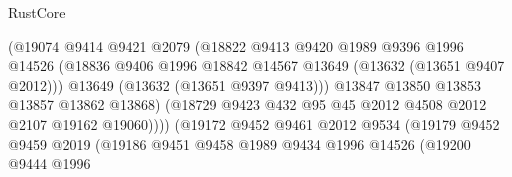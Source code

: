 \begin{lexlean}{RustCore}
\begin{coremodule}
                                      (@19074
                                        @9414
                                        @9421
                                        @2079
                                        (@18822
                                          @9413
                                          @9420
                                          @1989
                                          @9396
                                          @1996
                                          @14526
                                          (@18836
                                            @9406
                                            @1996
                                            @18842
                                            @14567
                                            @13649
                                            (@13632 (@13651 @9407 @2012)))
                                          @13649
                                          (@13632 (@13651 @9397 @9413)))
                                        @13847
                                        @13850
                                        @13853
                                        @13857
                                        @13862
                                        @13868)
                                      (@18729
                                        @9423
                                        @432
                                        @95
                                        @45
                                        @2012
                                        @4508
                                        @2012
                                        @2107
                                        @19162
                                        @19060))))
                                (@19172
                                  @9452
                                  @9461
                                  @2012
                                  @9534
                                  (@19179
                                    @9452
                                    @9459
                                    @2019
                                    (@19186
                                      @9451
                                      @9458
                                      @1989
                                      @9434
                                      @1996
                                      @14526
                                      (@19200
                                        @9444
                                        @1996

\end{coremodule}
\end{lexlean}
